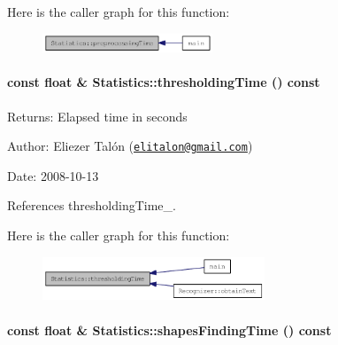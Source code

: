 Here is the caller graph for this function:\nopagebreak
\begin{figure}[H]
\begin{center}
\leavevmode
\includegraphics[width=144pt]{class_statistics_96aafebb86be480130007bd437875156_icgraph}
\end{center}
\end{figure}
\hypertarget{class_statistics_79a7c11e89528f21b663153c2636216a}{
\paragraph[thresholdingTime]{\setlength{\rightskip}{0pt plus 5cm}const float \& Statistics::thresholdingTime () const}\hfill}
\label{class_statistics_79a7c11e89528f21b663153c2636216a}


\begin{Desc}
\item[Returns:]Elapsed time in seconds\end{Desc}
\begin{Desc}
\item[Author:]Eliezer Talón (\href{mailto:elitalon@gmail.com}{\tt elitalon@gmail.com}) \end{Desc}
\begin{Desc}
\item[Date:]2008-10-13 \end{Desc}


References thresholdingTime\_\-.

Here is the caller graph for this function:\nopagebreak
\begin{figure}[H]
\begin{center}
\leavevmode
\includegraphics[width=188pt]{class_statistics_79a7c11e89528f21b663153c2636216a_icgraph}
\end{center}
\end{figure}
\hypertarget{class_statistics_cdb8852bc99d12a619d130ae2e6948ee}{
\paragraph[shapesFindingTime]{\setlength{\rightskip}{0pt plus 5cm}const float \& Statistics::shapesFindingTime () const}\hfill}
\label{class_statistics_cdb8852bc99d12a619d130ae2e6948ee}


